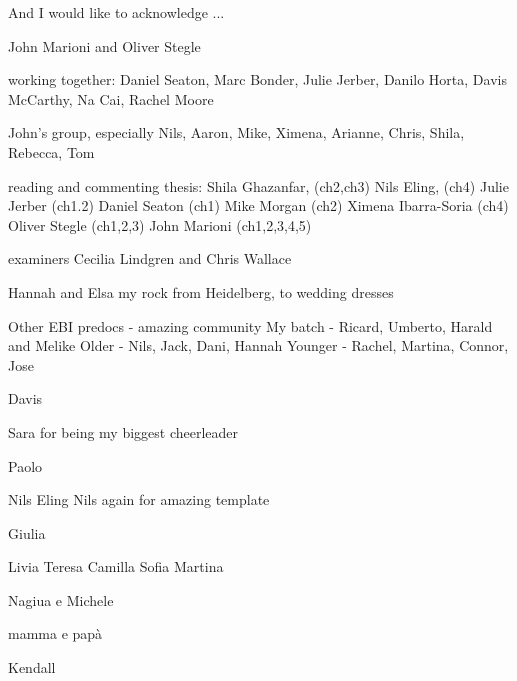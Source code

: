 
\begin{acknowledgements}      


And I would like to acknowledge ...

John Marioni and Oliver Stegle

working together: Daniel Seaton, Marc Bonder, Julie Jerber, Danilo Horta, Davis McCarthy, Na Cai, Rachel Moore

John's group, especially Nils, Aaron, Mike, Ximena, Arianne, Chris, Shila, Rebecca, Tom

reading and commenting thesis: 
Shila Ghazanfar, (ch2,ch3)
Nils Eling, (ch4)
Julie Jerber  (ch1.2)
Daniel Seaton (ch1)
Mike Morgan (ch2)
Ximena Ibarra-Soria (ch4)
Oliver Stegle (ch1,2,3)
John Marioni (ch1,2,3,4,5)

examiners 
Cecilia Lindgren and Chris Wallace

Hannah and Elsa my rock
from Heidelberg, to wedding dresses

Other EBI predocs - amazing community
My batch - Ricard, Umberto, Harald and Melike
Older - Nils, Jack, Dani, Hannah
Younger - Rachel, Martina, Connor, Jose

Davis 

Sara for being my biggest cheerleader

Paolo

Nils Eling
Nils again for amazing template

Giulia

Livia Teresa Camilla Sofia Martina

Nagiua e Michele

mamma e papà

Kendall

\end{acknowledgements}
